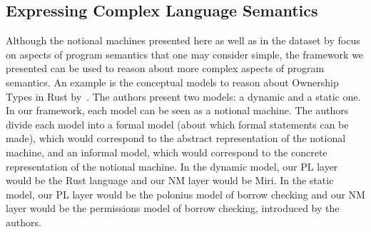 %

\subsection{Expressing Complex Language Semantics}
\label{sec:more-complexity}

Although
the notional machines presented here as well as in the dataset by \citet{fincherNotionalMachinesComputing2020}
focus on aspects of program semantics that one may consider simple,
the framework we presented can be used to reason about more complex aspects of program semantics.
%
An example
is
the conceptual models
to reason about Ownership Types in Rust by~\citet{crichtonGroundedConceptualModel2023}.
The authors present two models: a dynamic and a static one.
In our framework,
each model can be seen as a notional machine.
The authors divide each model into a formal model (about which formal statements can be made), which would correspond to the abstract representation of the notional machine,
and an informal model, which would correspond to the concrete representation of the notional machine.
%
In the dynamic model,
our PL layer would be the Rust language
and
our NM layer would be Miri.
%
In the static model,
our PL layer would be the polonius model of borrow checking
and
our NM layer would be the permissions model of borrow checking,
introduced by the authors.

